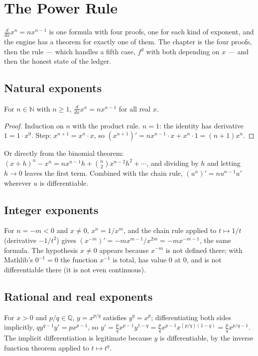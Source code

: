 \chapter{The Power Rule}\label{ch:power}

$\frac{d}{dx} x^n = n x^{n-1}$ is one formula with four proofs, one for each kind of exponent,
and the engine has a theorem for exactly one of them. The chapter is the four proofs, then the
rule --- which handles a fifth case, $f^g$ with both depending on $x$ --- and then the honest
state of the ledger.

\section{Natural exponents}

\begin{theorem}
  For $n \in \mathbb{N}$ with $n \ge 1$, $\frac{d}{dx} x^n = n x^{n-1}$ for all real $x$.
\end{theorem}
\begin{proof}
  Induction on $n$ with the product rule. $n = 1$: the identity has derivative $1 = 1 \cdot x^0$.
  Step: $x^{n+1} = x^n \cdot x$, so $(x^{n+1})' = n x^{n-1} \cdot x + x^n \cdot 1 = (n+1)x^n$.
\end{proof}

Or directly from the binomial theorem: $(x+h)^n - x^n = n x^{n-1} h + \binom{n}{2} x^{n-2} h^2 +
\cdots$, and dividing by $h$ and letting $h \to 0$ leaves the first term. Combined with the chain
rule, $(u^n)' = n u^{n-1} u'$ wherever $u$ is differentiable.

\section{Integer exponents}

For $n = -m < 0$ and $x \neq 0$, $x^n = 1/x^m$, and the chain rule applied to $t \mapsto 1/t$
(derivative $-1/t^2$) gives $(x^{-m})' = -m x^{m-1}/x^{2m} = -m x^{-m-1}$, the same formula.
The hypothesis $x \neq 0$ appears because $x^{-m}$ is not defined there; with Mathlib's
$0^{-1} = 0$ the function $x^{-1}$ is total, has value $0$ at $0$, and is not differentiable
there (it is not even continuous).

\section{Rational and real exponents}

For $x > 0$ and $p/q \in \mathbb{Q}$, $y = x^{p/q}$ satisfies $y^q = x^p$; differentiating both
sides implicitly, $q y^{q-1} y' = p x^{p-1}$, so $y' = \frac{p}{q} x^{p-1} y^{1-q} =
\frac{p}{q} x^{p-1} x^{(p/q)(1-q)} = \frac{p}{q} x^{p/q - 1}$. The implicit differentiation is
legitimate because $y$ is differentiable, by the inverse function theorem applied to
$t \mapsto t^q$.

